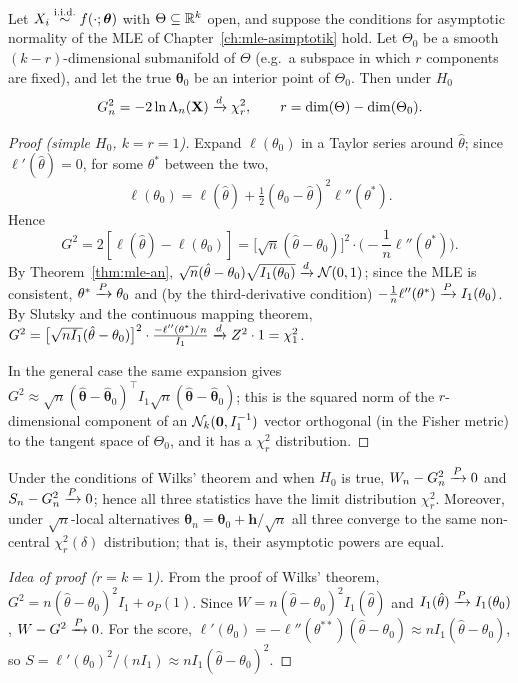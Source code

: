 \documentclass[main.tex]{subfiles}
\begin{document}
\begin{theorem}\label{thm:wilks}
Let $X_i\overset{\text{i.i.d.}}{\sim} f(\cdot;\bm\theta)$ with $\Theta\subseteq\mathbb{R}^k$ open, and suppose the conditions for asymptotic normality of the MLE of Chapter~\ref{ch:mle-asimptotik} hold. Let $\Theta_0$ be a smooth $(k-r)$-dimensional submanifold of $\Theta$ (e.g.\ a subspace in which $r$ components are fixed), and let the true $\bm\theta_0$ be an interior point of $\Theta_0$. Then under $H_0$
\[
G_n^2 = -2 \ln \Lambda_n(\mathbf{X}) \xrightarrow{d} \chi^2_r,\qquad r = \dim(\Theta) - \dim(\Theta_0).
\]
\end{theorem}
\begin{proof}[Proof (simple $H_0$, $k=r=1$)]
Expand $\ell(\theta_0)$ in a Taylor series around $\hat\theta$; since $\ell'(\hat\theta)=0$, for some $\theta^*$ between the two,
\[
\ell(\theta_0)=\ell(\hat\theta)+\tfrac12(\theta_0-\hat\theta)^2\ell''(\theta^*).
\]
Hence
\[
G^2=2[\ell(\hat\theta)-\ell(\theta_0)]=\Big[\sqrt n(\hat\theta-\theta_0)\Big]^2\cdot\Big(-\frac1n\ell''(\theta^*)\Big).
\]
By Theorem~\ref{thm:mle-an}, $\sqrt n(\hat\theta-\theta_0)\sqrt{I_1(\theta_0)}\xrightarrow{d}\mathcal{N}(0,1)$; since the MLE is consistent, $\theta^*\xrightarrow{P}\theta_0$ and (by the third-derivative condition) $-\frac1n\ell''(\theta^*)\xrightarrow{P} I_1(\theta_0)$. By Slutsky and the continuous mapping theorem, $G^2=\big[\sqrt{nI_1}(\hat\theta-\theta_0)\big]^2\cdot\frac{-\ell''(\theta^*)/n}{I_1}\xrightarrow{d} Z^2\cdot1=\chi^2_1$.

In the general case the same expansion gives $G^2\approx\sqrt n(\hat{\bm\theta}-\hat{\bm\theta}_0)^\top I_1\sqrt n(\hat{\bm\theta}-\hat{\bm\theta}_0)$; this is the squared norm of the $r$-dimensional component of an $\mathcal{N}_k(\mathbf 0,I_1^{-1})$ vector orthogonal (in the Fisher metric) to the tangent space of $\Theta_0$, and it has a $\chi^2_r$ distribution.
\end{proof}

\begin{theorem}\label{thm:uclu}
Under the conditions of Wilks' theorem and when $H_0$ is true, $W_n-G_n^2\xrightarrow{P}0$ and $S_n-G_n^2\xrightarrow{P}0$; hence all three statistics have the limit distribution $\chi^2_r$. Moreover, under $\sqrt n$-local alternatives $\bm\theta_n=\bm\theta_0+\mathbf h/\sqrt n$ all three converge to the same non-central $\chi^2_r(\delta)$ distribution; that is, their asymptotic powers are equal.
\end{theorem}
\begin{proof}[Idea of proof ($r=k=1$)]
From the proof of Wilks' theorem, $G^2=n(\hat\theta-\theta_0)^2I_1+o_P(1)$. Since $W=n(\hat\theta-\theta_0)^2I_1(\hat\theta)$ and $I_1(\hat\theta)\xrightarrow{P} I_1(\theta_0)$, $W-G^2\xrightarrow{P}0$. For the score, $\ell'(\theta_0)=-\ell''(\theta^{**})(\hat\theta-\theta_0)\approx nI_1(\hat\theta-\theta_0)$, so $S=\ell'(\theta_0)^2/(nI_1)\approx n I_1(\hat\theta-\theta_0)^2$.
\end{proof}
\end{document}
